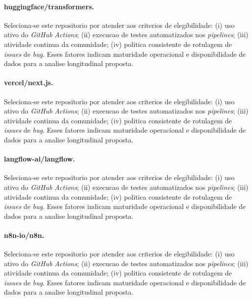 \paragraph{huggingface/transformers.} Seleciona-se este repositorio por atender aos criterios de elegibilidade: (i) uso ativo do \textit{GitHub Actions}; (ii) execucao de testes automatizados nos \textit{pipelines}; (iii) atividade continua da comunidade; (iv) politica consistente de rotulagem de \textit{issues} de \textit{bug}. Esses fatores indicam maturidade operacional e disponibilidade de dados para a analise longitudinal proposta.
\paragraph{vercel/next.js.} Seleciona-se este repositorio por atender aos criterios de elegibilidade: (i) uso ativo do \textit{GitHub Actions}; (ii) execucao de testes automatizados nos \textit{pipelines}; (iii) atividade continua da comunidade; (iv) politica consistente de rotulagem de \textit{issues} de \textit{bug}. Esses fatores indicam maturidade operacional e disponibilidade de dados para a analise longitudinal proposta.
\paragraph{langflow-ai/langflow.} Seleciona-se este repositorio por atender aos criterios de elegibilidade: (i) uso ativo do \textit{GitHub Actions}; (ii) execucao de testes automatizados nos \textit{pipelines}; (iii) atividade continua da comunidade; (iv) politica consistente de rotulagem de \textit{issues} de \textit{bug}. Esses fatores indicam maturidade operacional e disponibilidade de dados para a analise longitudinal proposta.
\paragraph{n8n-io/n8n.} Seleciona-se este repositorio por atender aos criterios de elegibilidade: (i) uso ativo do \textit{GitHub Actions}; (ii) execucao de testes automatizados nos \textit{pipelines}; (iii) atividade continua da comunidade; (iv) politica consistente de rotulagem de \textit{issues} de \textit{bug}. Esses fatores indicam maturidade operacional e disponibilidade de dados para a analise longitudinal proposta.
